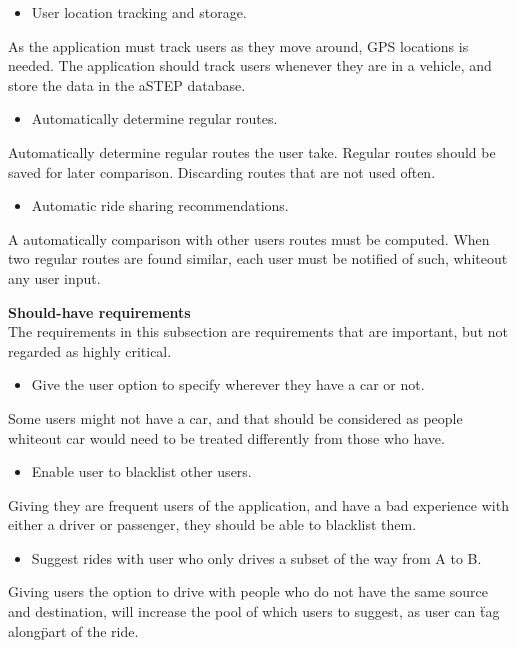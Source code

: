 \begin{itemize}
	\item User location tracking and storage.
\end{itemize}
As the application must track users as they move around, GPS locations is needed. The application should track users whenever they are in a vehicle, and store the data in the aSTEP database. 

\begin{itemize}
	\item Automatically determine regular routes.
\end{itemize}
Automatically determine regular routes the user take. Regular routes should be saved for later comparison. Discarding routes that are not used often.

\begin{itemize}
	\item Automatic ride sharing recommendations.
\end{itemize}
A automatically comparison with other users routes must be computed. When two regular routes are found similar, each user must be notified of such, whiteout any user input.


\textbf{Should-have requirements}\\
The requirements in this subsection are requirements that are important, but not regarded as highly critical.
\begin{itemize}
	\item Give the user option to specify wherever they have a car or not.
\end{itemize}
Some users might not have a car, and that should be considered as people whiteout car would need to be treated differently from those who have.

\begin{itemize}
	\item Enable user to blacklist other users.
\end{itemize}
Giving they are frequent users of the application, and have a bad experience with either a driver or passenger, they should be able to blacklist them.

\begin{itemize}
	\item Suggest rides with user who only drives a subset of the way from A to B.
\end{itemize}
Giving users the option to drive with people who do not have the same source and destination, will increase the pool of which users to suggest, as user can \"tag along\" part of the ride.


